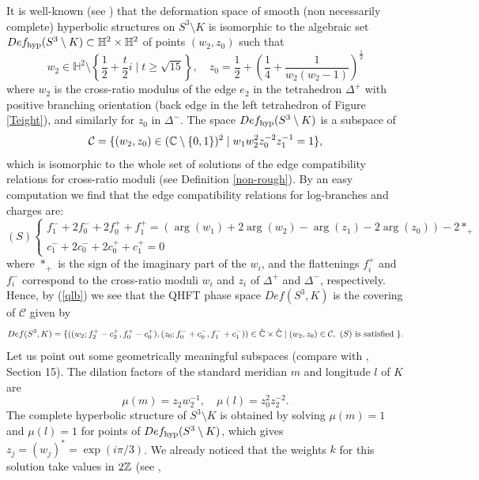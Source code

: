 It is well-known (see \cite{Th}) that the deformation space of smooth
(non necessarily complete) hyperbolic structures on $S^3 \setminus K$
is isomorphic to the algebraic set $Def_{{\rm hyp}}(S^3 \setminus K)
\subset \mathbb{H}^2 \times \mathbb{H}^2$ of points $(w_2,z_0)$ such
that
$$w_2 \in \mathbb{H}^2 \setminus \left\lbrace \frac{1}{2} +
\frac{t}{2}i \mid t \geq \sqrt{15} \right\rbrace,\quad z_0 =
\frac{1}{2} + \left(\frac{1}{4} +
\frac{1}{w_2(w_2-1)}\right)^{\frac{1}{2}}$$ where $w_2$ is the
cross-ratio modulus of the edge $e_2$ in the tetrahedron $\Delta^+$
with positive branching orientation (back edge in the left tetrahedron
of Figure \ref{Teight}), and similarly for $z_0$ in $\Delta^-$. The
space $Def_{{\rm hyp}}(S^3 \setminus K)$ is a subspace of 
\begin{equation}\label{subs}
\mathcal{C}=\{
(w_2,z_0) \in (\mathbb{C} \setminus \{0,1\})^2 \mid
w_1w_2^2z_0^{-2}z_1^{-1}=1\},
\end{equation} which is isomorphic to the whole set of solutions of the edge
compatibility relations for cross-ratio moduli (see Definition
\ref{non-rough}). By an easy computation we find that the edge
compatibility relations for log-branches and charges are:
\begin{equation}\label{eqfc}
(S)\left\lbrace\begin{array}{l}f_1^-+2f_0^-+2f_0^++f_1^+=
(\arg(w_1)+2\arg(w_2)-\arg(z_1)-2\arg(z_0))-2*_+\\
c_1^-+2c_0^-+2c_0^++c_1^+=0\end{array}\right.
\end{equation}
where $*_+$ is the sign of the imaginary part of the $w_i$, and the
flattenings $f_i^+$ and $f_i^-$ correspond to the cross-ratio moduli
$w_i$ and $z_i$ of $\Delta^+$ and $\Delta^-$, respectively. Hence, by
(\ref{qlb}) we see that the QHFT phase space $Def(S^3,K)$ is the
covering of $\mathcal{C}$ given by
$$Def(S^3,K)=\{((w_2;f_2^+-c_2^+,f_0^+-c_0^+),(z_0;f_0^-+c_0^-,f_1^-+c_1^-))
\in \hat{\mathbb{C}}\times\hat{\mathbb{C}} \mid (w_2,z_0) \in \mathcal{C},\ (S){\rm\
is\ satisfied}\ \}.$$ Let us point out some geometrically meaningful
subspaces (compare with \cite{N}, Section 15). The dilation factors of
the standard meridian $m$ and longitude $l$ of $K$ are
$$\mu(m) = z_2w_2^{-1},\quad \mu(l)=z_0^2z_2^{-2}.$$ The complete
hyperbolic structure of $S^3\setminus K$ is obtained by solving
$\mu(m)=1$ and $\mu(l)=1$ for points of $Def_{{\rm hyp}}(S^3 \setminus
K)$, which gives $z_j=(w_j)^* = \exp(i\pi/3)$. We already noticed that
the weights $k$ for this solution take values in $2\mathbb{Z}$ (see \cite{N},
